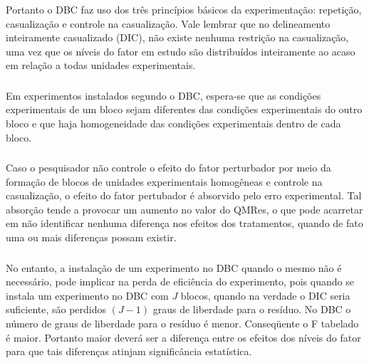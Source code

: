 \documentclass[14pt,aspectratio=1610]{beamer}
\begin{document}
\begin{frame}{}
\frametitle{}
\begin{block}{}
\justifying
Portanto o DBC faz uso dos três princípios básicos da experimentação: repetição, casualização e controle na casualização. Vale lembrar que no delineamento inteiramente casualizado (DIC), não existe nenhuma restrição na casualização, uma vez que os níveis do fator em estudo são distribuídos inteiramente ao acaso em relação a todas unidades experimentais.
\end{block}
\end{frame}

\begin{frame}{}
\frametitle{}
\begin{block}{}
\justifying
Em experimentos instalados segundo o DBC, espera-se que as condições experimentais de um bloco sejam diferentes das condições experimentais do outro bloco e que haja homogeneidade das condições experimentais dentro de cada bloco.
\end{block}
\end{frame}

\begin{frame}{}
\frametitle{}
\begin{block}{}
\justifying
Caso o pesquisador não controle o efeito do fator perturbador por meio da formação de blocos de unidades experimentais homogêneas e controle na casualização, o efeito do fator pertubador é absorvido pelo erro experimental. Tal absorção tende a provocar um aumento no valor do QMRes, o que pode acarretar em não identificar nenhuma diferença nos efeitos dos tratamentos, quando de fato uma ou mais diferenças possam existir.
\end{block}
\end{frame}

\begin{frame}{}
\frametitle{}
\begin{block}{}
\justifying
No entanto, a instalação de um experimento no DBC quando o mesmo não é
necessário, pode implicar na perda de eficiência do experimento, pois quando se instala um experimento no DBC com $J$ blocos, quando na verdade o DIC seria suficiente, são perdidos $(J-1)$ graus de liberdade para o resíduo. No DBC o número de graus de liberdade para o resíduo é menor. Conseqüente o F tabelado é maior. Portanto maior deverá ser a diferença entre os efeitos dos níveis do fator para que tais diferenças atinjam significância estatística.
\end{block}
\end{frame}
\end{document}
